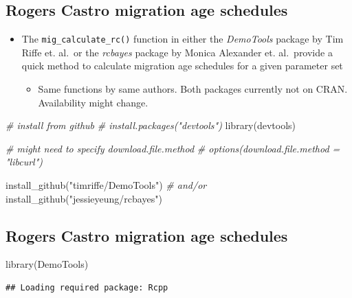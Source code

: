 \documentclass[
]{book}
\newenvironment{Shaded}{\begin{snugshade}}{\end{snugshade}}
\newcommand{\CommentTok}[1]{\textcolor[rgb]{0.56,0.35,0.01}{\textit{#1}}}
\newcommand{\FunctionTok}[1]{\textcolor[rgb]{0.00,0.00,0.00}{#1}}
\newcommand{\NormalTok}[1]{#1}
\newcommand{\StringTok}[1]{\textcolor[rgb]{0.31,0.60,0.02}{#1}}
\providecommand{\tightlist}{%
  \setlength{\itemsep}{0pt}\setlength{\parskip}{0pt}}
\begin{document}
\hypertarget{rogers-castro-migration-age-schedules-4}{%
\subsection{Rogers Castro migration age schedules}\label{rogers-castro-migration-age-schedules-4}}

\begin{itemize}
\tightlist
\item
  The \texttt{mig\_calculate\_rc()} function in either the \emph{DemoTools} package by Tim Riffe et. al.~or the \emph{rcbayes} package by Monica Alexander et. al.~provide a quick method to calculate migration age schedules for a given parameter set

  \begin{itemize}
  \tightlist
  \item
    Same functions by same authors. Both packages currently not on CRAN. Availability might change.
  \end{itemize}
\end{itemize}

\begin{Shaded}
\begin{Highlighting}[]
\CommentTok{\# install from github}
\CommentTok{\# install.packages("devtools")}
\FunctionTok{library}\NormalTok{(devtools)}

\CommentTok{\# might need to specify download.file.method}
\CommentTok{\# options(download.file.method = "libcurl")}

\FunctionTok{install\_github}\NormalTok{(}\StringTok{"timriffe/DemoTools"}\NormalTok{)}
\CommentTok{\# and/or }
\FunctionTok{install\_github}\NormalTok{(}\StringTok{"jessieyeung/rcbayes"}\NormalTok{)}
\end{Highlighting}
\end{Shaded}

\hypertarget{rogers-castro-migration-age-schedules-5}{%
\subsection{Rogers Castro migration age schedules}\label{rogers-castro-migration-age-schedules-5}}

\begin{Shaded}
\begin{Highlighting}[]
\FunctionTok{library}\NormalTok{(DemoTools)}
\end{Highlighting}
\end{Shaded}

\begin{verbatim}
## Loading required package: Rcpp
\end{verbatim}
\end{document}

